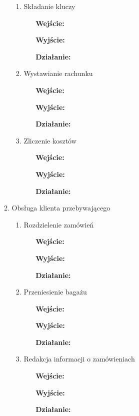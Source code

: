 \documentclass[a4paper, 11pt]{article}
\begin{document}
\begin{enumerate}[label*=\arabic*.]
\begin{enumerate}[label*=\arabic*.]
\begin{enumerate}[label*=\arabic*.]
				\item Składanie kluczy
				\begin{itemize}
					\item [\textbf{Wejście:}] 
					\item [\textbf{Wyjście:}]
					\item [\textbf{Działanie:}] 
				\end{itemize}
				\item Wystawianie rachunku
				\begin{itemize}
					\item [\textbf{Wejście:}] 
					\item [\textbf{Wyjście:}]
					\item [\textbf{Działanie:}] 
				\end{itemize}
				\item Zliczenie kosztów
				\begin{itemize}
					\item [\textbf{Wejście:}] 
					\item [\textbf{Wyjście:}]
					\item [\textbf{Działanie:}] 
				\end{itemize}
			\end{enumerate}						
			\item Obsługa klienta przebywającego
			\begin{enumerate}[label*=\arabic*.]
				\item Rozdzielenie zamówień
				\begin{itemize}
					\item [\textbf{Wejście:}] 
					\item [\textbf{Wyjście:}]
					\item [\textbf{Działanie:}] 
				\end{itemize}
				\item Przeniesienie bagażu
				\begin{itemize}
					\item [\textbf{Wejście:}] 
					\item [\textbf{Wyjście:}]
					\item [\textbf{Działanie:}] 
				\end{itemize}
				\item Redakcja informacji o zamówieniach
				\begin{itemize}
					\item [\textbf{Wejście:}] 
					\item [\textbf{Wyjście:}]
					\item [\textbf{Działanie:}] 

\end{itemize}
\end{enumerate}
\end{enumerate}
\end{enumerate}
\end{document}
